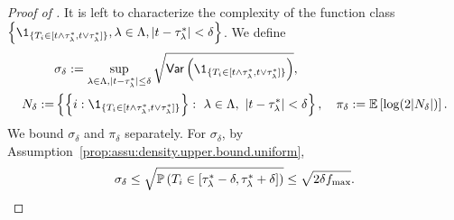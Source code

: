 \begin{proof}[Proof of ]
    It is left to characterize the complexity of the function class $\left\{\1_{\{\testStatistics{i} \in [\threshold \wedge \trueThreshold, \threshold \vee \trueThreshold]\}}, \lambda \in \Lambda, |t - \trueThreshold| < \delta\right\}$. We define
        \begin{align*}
        &\sigma_\delta
        := \sup_{\lambda \in \Lambda, |\threshold - \trueThreshold| \le \delta} \sqrt{\var\left(\1_{\{\testStatistics{i} \in [\threshold \wedge \trueThreshold, \threshold \vee \trueThreshold]\}}\right)},\\
        N_\delta :=& \left\{\left\{i: \1_{\{\testStatistics{i} \in [\threshold \wedge \trueThreshold, \threshold \vee \trueThreshold]\}}\right\}: ~\lambda \in \Lambda, ~|\threshold - \trueThreshold| < \delta \right\}, \quad
        \pi_\delta
        := \EE \left[\log(2 |N_\delta|)\right].
    \end{align*}
    We bound $\sigma_\delta$ and $ \pi_\delta $ separately. For $\sigma_\delta$, by Assumption~\ref{prop:assu:density.upper.bound.uniform},
    \begin{align*}
        \sigma_\delta
        \le \sqrt{\PP\left(\testStatistics{i} \in [\trueThreshold - \delta, \trueThreshold + \delta]\right)}
        \le \sqrt{2 \delta \pdfTestStatistics{\max}}.

\end{align*}
\end{proof}
